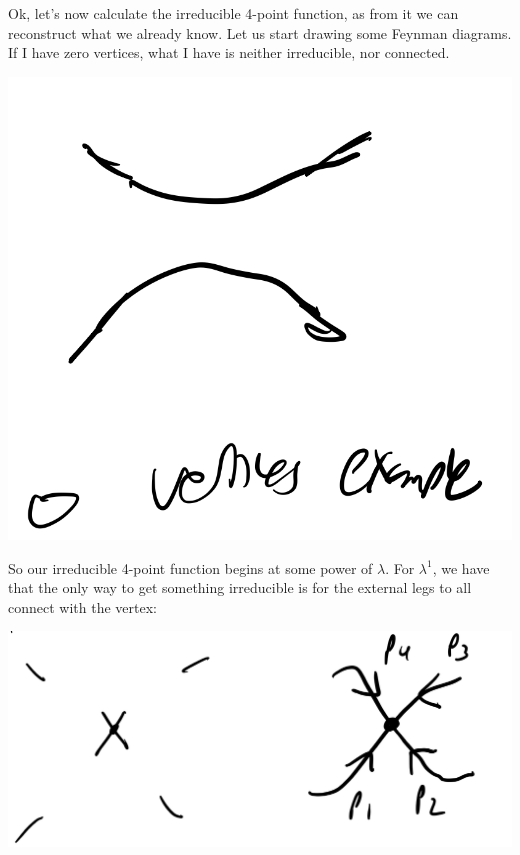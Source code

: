 Ok, let's now calculate the irreducible 4-point function, as from it we can reconstruct what we already know. Let us start drawing some Feynman diagrams. If I have zero vertices, what I have is neither irreducible, nor connected.

\begin{center}
\includegraphics[scale=0.3]{Images/fig-lec28feynman5.png}
\end{center}

So our irreducible 4-point function begins at some power of $\lambda$. For $\lambda^1$, we have that the only way to get something irreducible is for the external legs to all connect with the vertex:

\begin{center}
\includegraphics[scale=0.3]{Images/fig-lec28feynman6.png}
\end{center}

